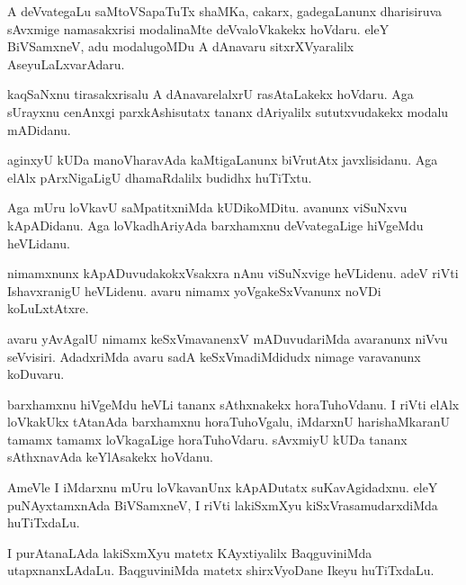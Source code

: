 \documentclass{article}
\begin{document}
\begin{mn}%
A deVvategaLu saMtoVSapaTuTx shaMKa, cakarx, gadegaLanunx dharisiruva
sAvxmige namasakxrisi modalinaMte deVvaloVkakekx hoVdaru. eleY
BiVSamxneV, adu modalugoMDu A dAnavaru sitxrXVyaralilx AseyuLaLxvarAdaru.
\end{mn}

\begin{mn}
kaqSaNxnu tirasakxrisalu A dAnavarelalxrU rasAtaLakekx hoVdaru. Aga
sUrayxnu cenAnxgi parxkAshisutatx tananx dAriyalilx sututxvudakekx
modalu mADidanu.
\end{mn}

\begin{mn}%
aginxyU kUDa manoVharavAda kaMtigaLanunx biVrutAtx javxlisidanu. Aga
elAlx pArxNigaLigU dhamaRdalilx budidhx huTiTxtu.
\end{mn}

\begin{mn}
Aga mUru loVkavU saMpatitxniMda kUDikoMDitu. avanunx viSuNxvu
kApADidanu. Aga loVkadhAriyAda barxhamxnu deVvategaLige hiVgeMdu heVLidanu.
\end{mn}

\begin{mn}%
nimamxnunx kApADuvudakokxVsakxra nAnu viSuNxvige heVLidenu. adeV riVti
IshavxranigU heVLidenu. avaru nimamx yoVgakeSxVvanunx noVDi koLuLxtAtxre.
\end{mn}

\begin{mn}
avaru yAvAgalU nimamx keSxVmavanenxV mADuvudariMda avaranunx niVvu
seVvisiri. AdadxriMda avaru sadA keSxVmadiMdidudx nimage varavanunx koDuvaru.
\end{mn}

\begin{mn}%
barxhamxnu hiVgeMdu heVLi tananx sAthxnakekx horaTuhoVdanu. I riVti
elAlx loVkakUkx tAtanAda barxhamxnu horaTuhoVgalu, iMdarxnU
harishaMkaranU tamamx tamamx loVkagaLige horaTuhoVdaru. sAvxmiyU kUDa
tananx sAthxnavAda keYlAsakekx hoVdanu.
\end{mn}

\begin{mn}
AmeVle I iMdarxnu mUru loVkavanUnx kApADutatx suKavAgidadxnu. eleY
puNAyxtamxnAda BiVSamxneV, I riVti lakiSxmXyu kiSxVrasamudarxdiMda huTiTxdaLu.
\end{mn}

\begin{mn}%
I purAtanaLAda lakiSxmXyu matetx KAyxtiyalilx BaqguviniMda
utapxnanxLAdaLu. BaqguviniMda matetx shirxVyoDane Ikeyu huTiTxdaLu.
\end{mn}
\end{document}
